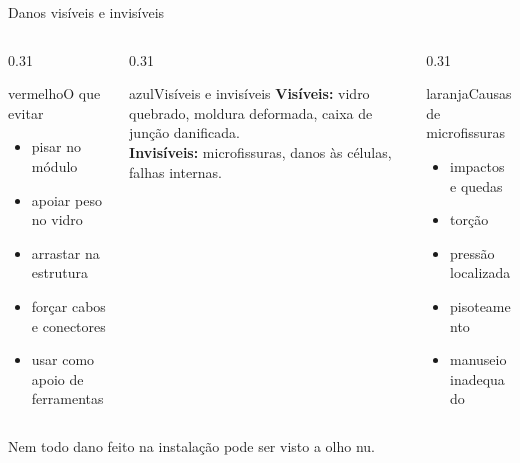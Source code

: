 \documentclass[aspectratio=169,10pt,xcolor=table]{beamer}
\newcommand{\frase}[1]{\vspace{0.1em}\begin{destaque}#1\end{destaque}}
\begin{document}
\begin{frame}{Danos visíveis e invisíveis}
  \begin{columns}[T]
    \begin{column}{0.31\textwidth}
      \begin{card}[equal height group=dn]{vermelho}{\faBan\enspace O que evitar}
        \begin{itemize}
          \item pisar no módulo
          \item apoiar peso no vidro
          \item arrastar na estrutura
          \item forçar cabos e conectores
          \item usar como apoio de ferramentas
        \end{itemize}
      \end{card}
    \end{column}
    \begin{column}{0.31\textwidth}
      \begin{card}[equal height group=dn]{azul}{\faEye\enspace Visíveis e invisíveis}
        \textbf{Visíveis:} vidro quebrado, moldura deformada, caixa de junção danificada.\\[0.4em]
        \textbf{Invisíveis:} microfissuras, danos às células, falhas internas.
      \end{card}
    \end{column}
    \begin{column}{0.31\textwidth}
      \begin{card}[equal height group=dn]{laranja}{\faSearchPlus\enspace Causas de microfissuras}
        \begin{itemize}
          \item impactos e quedas
          \item torção
          \item pressão localizada
          \item pisoteamento
          \item manuseio inadequado
        \end{itemize}
      \end{card}
    \end{column}
  \end{columns}
  \frase{Nem todo dano feito na instalação pode ser visto a olho nu.}
\end{frame}
\end{document}
